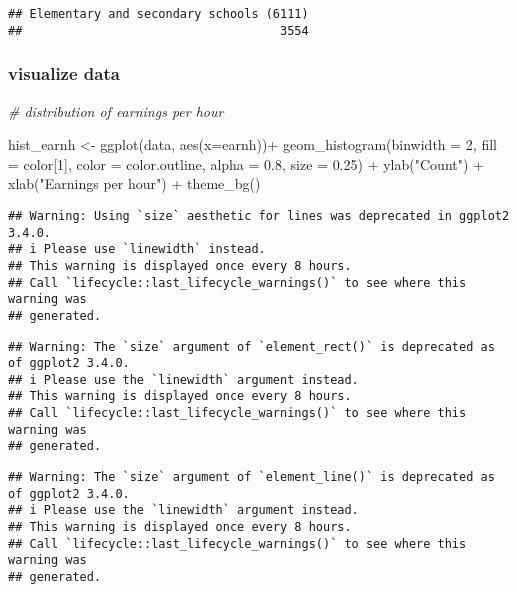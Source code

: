 \documentclass[
]{article}
\newenvironment{Shaded}{\begin{snugshade}}{\end{snugshade}}
\newcommand{\AttributeTok}[1]{\textcolor[rgb]{0.77,0.63,0.00}{#1}}
\newcommand{\CommentTok}[1]{\textcolor[rgb]{0.56,0.35,0.01}{\textit{#1}}}
\newcommand{\DecValTok}[1]{\textcolor[rgb]{0.00,0.00,0.81}{#1}}
\newcommand{\FloatTok}[1]{\textcolor[rgb]{0.00,0.00,0.81}{#1}}
\newcommand{\FunctionTok}[1]{\textcolor[rgb]{0.00,0.00,0.00}{#1}}
\newcommand{\NormalTok}[1]{#1}
\newcommand{\OtherTok}[1]{\textcolor[rgb]{0.56,0.35,0.01}{#1}}
\newcommand{\SpecialCharTok}[1]{\textcolor[rgb]{0.00,0.00,0.00}{#1}}
\newcommand{\StringTok}[1]{\textcolor[rgb]{0.31,0.60,0.02}{#1}}
\begin{document}
\begin{verbatim}
## Elementary and secondary schools (6111) 
##                                    3554
\end{verbatim}

\hypertarget{visualize-data}{%
\subsubsection{visualize data}\label{visualize-data}}

\begin{Shaded}
\begin{Highlighting}[]
\CommentTok{\# distribution of earnings per hour }


\NormalTok{hist\_earnh }\OtherTok{\textless{}{-}} \FunctionTok{ggplot}\NormalTok{(data, }\FunctionTok{aes}\NormalTok{(}\AttributeTok{x=}\NormalTok{earnh))}\SpecialCharTok{+}
              \FunctionTok{geom\_histogram}\NormalTok{(}\AttributeTok{binwidth =} \DecValTok{2}\NormalTok{, }\AttributeTok{fill =}\NormalTok{ color[}\DecValTok{1}\NormalTok{], }\AttributeTok{color =}\NormalTok{ color.outline, }
                             \AttributeTok{alpha =} \FloatTok{0.8}\NormalTok{, }\AttributeTok{size =} \FloatTok{0.25}\NormalTok{) }\SpecialCharTok{+}
              \FunctionTok{ylab}\NormalTok{(}\StringTok{"Count"}\NormalTok{) }\SpecialCharTok{+}
              \FunctionTok{xlab}\NormalTok{(}\StringTok{"Earnings per hour"}\NormalTok{) }\SpecialCharTok{+}
              \FunctionTok{theme\_bg}\NormalTok{()}
\end{Highlighting}
\end{Shaded}

\begin{verbatim}
## Warning: Using `size` aesthetic for lines was deprecated in ggplot2 3.4.0.
## i Please use `linewidth` instead.
## This warning is displayed once every 8 hours.
## Call `lifecycle::last_lifecycle_warnings()` to see where this warning was
## generated.
\end{verbatim}

\begin{verbatim}
## Warning: The `size` argument of `element_rect()` is deprecated as of ggplot2 3.4.0.
## i Please use the `linewidth` argument instead.
## This warning is displayed once every 8 hours.
## Call `lifecycle::last_lifecycle_warnings()` to see where this warning was
## generated.
\end{verbatim}

\begin{verbatim}
## Warning: The `size` argument of `element_line()` is deprecated as of ggplot2 3.4.0.
## i Please use the `linewidth` argument instead.
## This warning is displayed once every 8 hours.
## Call `lifecycle::last_lifecycle_warnings()` to see where this warning was
## generated.
\end{verbatim}
\end{document}
